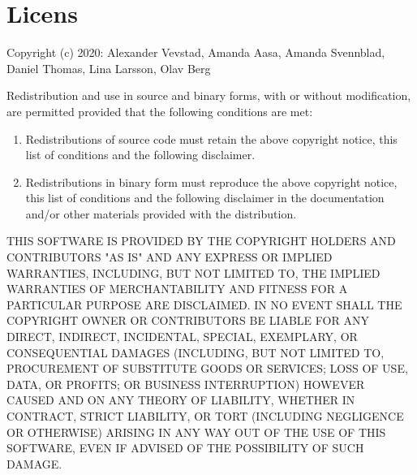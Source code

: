 \section{Licens}
\label{ref:licens}
Copyright (c) 2020: Alexander Vevstad, Amanda Aasa, Amanda Svennblad, Daniel Thomas, Lina Larsson, Olav Berg

Redistribution and use in source and binary forms, with or without
modification, are permitted provided that the following conditions are met:

\begin{enumerate}
    \item Redistributions of source code must retain the above copyright notice, this list of conditions and the following disclaimer.
    \item Redistributions in binary form must reproduce the above copyright notice, this list of conditions and the following disclaimer in the documentation and/or other materials provided with the distribution.
\end{enumerate}

THIS SOFTWARE IS PROVIDED BY THE COPYRIGHT HOLDERS AND CONTRIBUTORS "AS IS" AND ANY EXPRESS OR IMPLIED WARRANTIES, INCLUDING,
BUT NOT LIMITED TO, THE IMPLIED WARRANTIES OF MERCHANTABILITY AND FITNESS FOR A PARTICULAR PURPOSE ARE DISCLAIMED. IN NO EVENT
SHALL THE COPYRIGHT OWNER OR CONTRIBUTORS BE LIABLE FOR ANY DIRECT, INDIRECT, INCIDENTAL, SPECIAL, EXEMPLARY, OR CONSEQUENTIAL
DAMAGES (INCLUDING, BUT NOT LIMITED TO, PROCUREMENT OF SUBSTITUTE GOODS OR SERVICES; LOSS OF USE, DATA, OR PROFITS; OR BUSINESS
INTERRUPTION) HOWEVER CAUSED AND ON ANY THEORY OF LIABILITY, WHETHER IN CONTRACT, STRICT LIABILITY, OR TORT (INCLUDING
NEGLIGENCE OR OTHERWISE) ARISING IN ANY WAY OUT OF THE USE OF THIS SOFTWARE, EVEN IF ADVISED OF THE POSSIBILITY OF SUCH DAMAGE.
